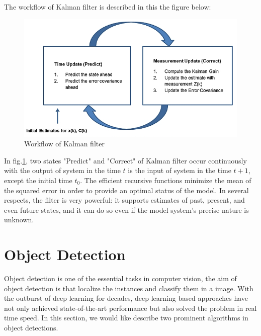\pagebreak
\hspace{0.45cm}The workflow of Kalman filter is described in this the figure below:
\begin{figure}[h!]
    \centering
    \includegraphics[scale=0.7]{Chapters/Fig/kal_dig_2.png}
    \caption{Workflow of Kalman filter}
    \label{fig:kalman_wf}
\end{figure}
\par
In fig.\ref{fig:kalman_wf}, two states "Predict" and "Correct" of Kalman filter 
occur continuously with the output of system in the time $t$ is the input of system in the time $t+1$, except the initial time $t_0$.
The efficient recursive functions minimize the mean of the squared error in order to provide an optimal status of the model. In several respects, the filter is very powerful: it supports estimates of past, present, and even future states, and it can do so even if the model system's precise nature is unknown.






\section{Object Detection}
\hspace{0.45cm}Object detection is one of the essential tasks in computer vision, the aim of object detection is that localize the instances and classify them in a
image. With the outburst of deep learning for decades, deep learning based approaches have not only achieved state-of-the-art performance but also
solved the problem in real time speed. In this section, we would like describe two prominent algorithms in object detections.
